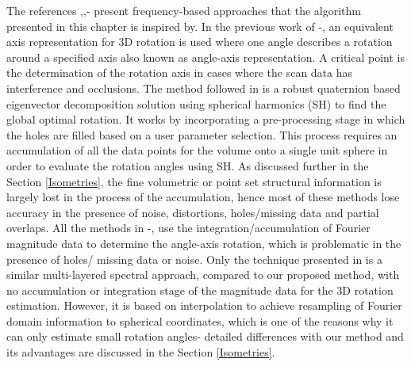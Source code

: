 \documentclass{UCF_ETD}
\begin{document}
The references \cite{Salah2013},\cite{Bulow2013},\cite{Lucchese02}-\cite{Bermanis2010} present frequency-based approaches that the algorithm
presented in this chapter is inspired by. 
In the previous work of \cite{Lucchese02}-\cite{KellerTSP2006}, an equivalent axis representation for $3$D rotation is used where one angle describes a rotation around a specified axis also known as angle-axis representation. A critical point is the determination of the rotation axis in cases where the scan data has interference and occlusions. The method followed in \cite{Salah2013} is a robust quaternion based eigenvector decomposition solution using spherical harmonics (SH) to find the global optimal rotation. It works by incorporating a pre-processing stage in which the holes are filled based on a user parameter selection. This process requires an accumulation of all the data points for the volume onto a single unit sphere in order to evaluate the rotation angles using SH. As discussed further in the Section \ref{Isometries}, the fine volumetric or point set structural information is largely lost in the process of the accumulation, hence most of these methods lose accuracy in the presence of noise, distortions, holes/missing data and partial overlaps. All the methods in \cite{Lucchese02}-\cite{KellerTSP2006}, \cite{Salah2013} use the integration/accumulation of Fourier magnitude data to determine the angle-axis rotation, which is problematic in the presence of holes/ missing data or noise. Only the technique presented in \cite{Bulow2013} is a similar multi-layered spectral approach, compared to our proposed method, with no accumulation or integration stage of the magnitude data for the $3$D rotation estimation. However, it is based on interpolation to achieve resampling of Fourier domain information to spherical coordinates, which is one of the reasons why it can only estimate small rotation angles- detailed differences with our method and its advantages are discussed in the Section \ref{Isometries}. 
\end{document}
